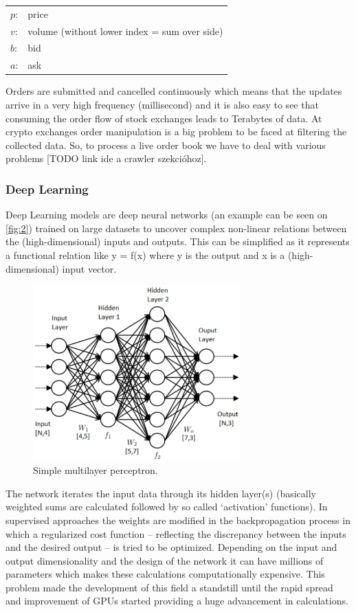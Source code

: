 \documentclass[11pt,a4paper,oneside]{article}
\begin{document}
  \begin{center}
    \begin{tabular}{l l}
      $p$: & price \\
      $v$: & volume (without lower index = sum over side) \\
      $b$: & bid \\
      $a$: & ask
    \end{tabular}
  \end{center}

  Orders are submitted and cancelled continuously which means that the updates arrive in a very high frequency 
  (millisecond) and it is also easy to see that consuming the order flow of stock exchanges leads to Terabytes of data. 
  At crypto exchanges order manipulation is a big problem to be faced at filtering the collected data. So, to process a 
  live order book we have to deal with various problems [TODO link ide a crawler szekcióhoz].

  \subsubsection{Deep Learning}
  \label{sec:deep_learning}

  Deep Learning models are deep neural networks (an example can be seen on \autoref{fig:2}) trained on large datasets to 
  uncover complex non-linear relations between the (high-dimensional) inputs and outputs. This can be simplified as it 
  represents a functional relation like y = f(x) where y is the output and x is a (high-dimensional) input vector.

  \begin{figure}[tbh]
    \centering
    \includegraphics[width=8cm]{mlp.png}
    \caption{Simple multilayer perceptron.}
    \label{fig:2}
  \end{figure}

  The network iterates the input data through its hidden layer(s) (basically weighted sums are calculated followed by 
  so called ‘activation’ functions). In supervised approaches the weights are modified in the backpropagation process 
  in which a regularized cost function – reflecting the discrepancy between the inputs and the desired output – is tried 
  to be optimized. Depending on the input and output dimensionality and the design of the network it can have millions 
  of parameters which makes these calculations computationally expensive. This problem made the development of this 
  field a standstill until the rapid spread and improvement of GPUs started providing a huge advancement in 
  calculations.
\end{document}
